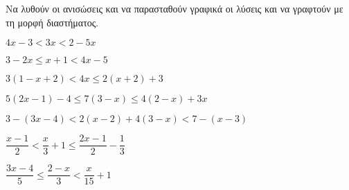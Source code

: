 Να λυθούν οι ανισώσεις και να παρασταθούν γραφικά οι λύσεις και να γραφτούν με τη μορφή διαστήματος.
\begin{multicols}{2}
\begin{alist}
\item $ 4x-3<3x<2-5x $
\item $ 3-2x\leq x+1<4x-5 $
\item $ 3(1-x+2)<4x\leq2(x+2)+3 $
\item $ 5(2x-1)-4\leq 7(3-x)\leq 4(2-x)+3x $
\item $ 3-(3x-4)<2(x-2)+4(3-x)<7-(x-3) $
\item $ \dfrac{x-1}{2}<\dfrac{x}{3}+1\leq\dfrac{2x-1}{2}-\dfrac{1}{3} $
\item $ \dfrac{3x-4}{5}\leq\dfrac{2-x}{3}<\dfrac{x}{15}+1 $
\end{alist}
\end{multicols}
